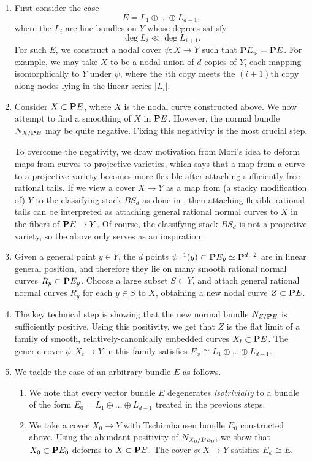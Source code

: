 \documentclass[11 pt]{amsart}
\renewcommand {\P}{{\bf P}}
\providecommand {\from}{{\colon}}
\numberwithin{equation}{section}
\begin{document}
\begin{enumerate}
\item First consider the case
  \[E = L_1 \oplus \dots \oplus L_{d-1},\]
  where the $L_i$ are line bundles on $Y$ whose degrees satisfy
  \[ \deg L_i \ll \deg L_{i+1}.\]
  For such $E$, we construct a nodal cover $\psi \from X \to Y$ such that $\P E_{\psi} = \P E$.
  For example, we may take $X$ to be a nodal union of $d$ copies of $Y$, each mapping isomorphically to $Y$ under $\psi$, where the $i$th copy meets the $(i+1)$th copy along nodes lying in the linear series $|L_i|$.
  
\item
  Consider $X \subset \P E$, where $X$ is the nodal curve constructed above.
  We now attempt to find a smoothing of $X$ in $\P E$.
  However, the normal bundle $N_{X/ \P E}$ may be quite negative.
  Fixing this negativity is the most crucial step.

  To overcome the negativity, we draw motivation from Mori's idea to deform maps from curves to projective varieties, which says that a map from a curve to a projective variety becomes more flexible after attaching sufficiently free rational tails.
  If we view a cover $X \to Y$ as a map from (a stacky modification of) $Y$ to the classifying stack $BS_d$ as done in \cite{abr.cor.vis:03}, then attaching flexible rational tails can be interpreted as attaching general rational normal curves to $X$ in the fibers of $\P E \to Y$.
  Of course, the classifying stack $BS_d$ is not a projective variety, so the above only serves as an inspiration.

\item
  Given a general point $y \in Y$, the $d$ points $\psi^{-1}(y) \subset \P E_{y} \simeq \P^{d-2}$ are in linear general position, and therefore they lie on many smooth rational normal curves $R_{y} \subset \P E_{y}$.
  Choose a large subset $S \subset Y$, and attach general rational normal curves $R_y$ for each $y \in S$ to $X$, obtaining a new nodal curve $Z \subset \P E$.

\item
  The key technical step is showing that the new normal bundle $N_{Z/\P E}$ is sufficiently positive.
  Using this positivity, we get that $Z$ is the flat limit of a family of smooth, relatively-canonically embedded curves $X_t \subset \P E$.
  The generic cover $\phi \from X_t \to Y$ in this family satisfies $E_\phi \cong L_1 \oplus \dots \oplus L_{d-1}$.

\item
  We tackle the case of an arbitrary bundle $E$ as follows.
  \begin{enumerate}
  \item We note that every vector bundle $E$ degenerates \emph{isotrivially} to a bundle of the form $E_0 = L_1 \oplus \dots \oplus L_{d-1}$ treated in the previous steps.
  \item We take a cover $X_0 \to Y$ with Tschirnhausen bundle $E_0$ constructed above.
    Using the abundant positivity of $N_{X_0/\P E_0}$, we show that $X_0 \subset \P E_0$ deforms to $X \subset \P E$.
    The cover $\phi \from X \to Y$ satisfies $E_\phi \cong  E$.
  \end{enumerate}
\end{enumerate}
\end{document}
